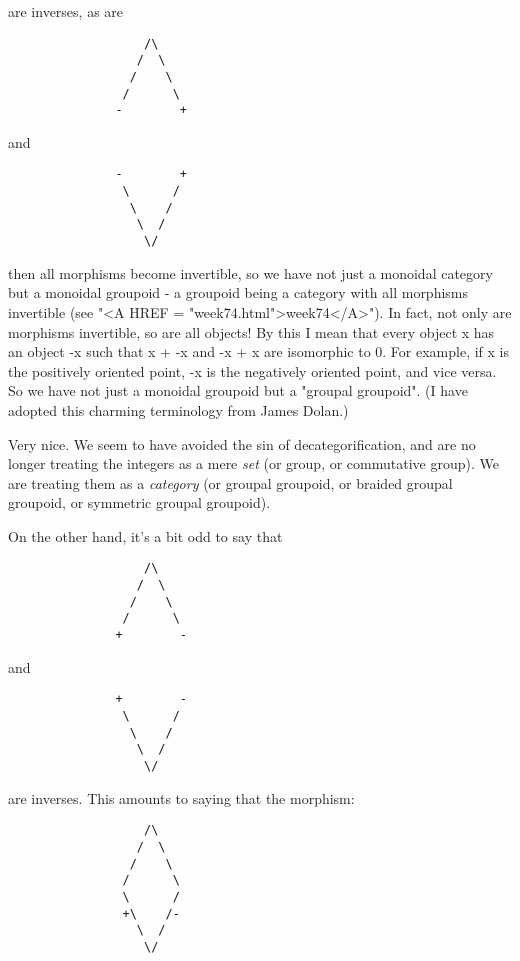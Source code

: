 are inverses, as are 

\begin{verbatim}
                   /\
                  /  \
                 /    \
                /      \
               -        +

\end{verbatim}
    
and
\begin{verbatim}
               -        +
                \      /
                 \    /
                  \  /
                   \/

\end{verbatim}
    
then all morphisms become invertible, so we have not just a monoidal
category but a monoidal groupoid - a groupoid being a category with all
morphisms invertible (see "<A HREF = "week74.html">week74</A>").  In fact, not only are morphisms
invertible, so are all objects!  By this I mean that every object x
has an object -x such that x + -x and -x + x are isomorphic to 0.
For example, if x is the positively oriented point, -x is the negatively
oriented point, and vice versa.  So we have not just a monoidal groupoid
but a "groupal groupoid".  (I have adopted this charming terminology
from James Dolan.)

Very nice.  We seem to have avoided the sin of decategorification, and
are no longer treating the integers as a mere \emph{set} (or group, or
commutative group).  We are treating them as a \emph{category} (or groupal 
groupoid, or braided groupal groupoid, or symmetric groupal groupoid).

On the other hand, it's a bit odd to say that 

\begin{verbatim}
                   /\
                  /  \
                 /    \
                /      \
               +        -

\end{verbatim}
    
and
\begin{verbatim}
               +        -
                \      /
                 \    /
                  \  /
                   \/

\end{verbatim}
    
are inverses.  This amounts to saying that the morphism:

\begin{verbatim}
                   /\
                  /  \
                 /    \
                /      \
                \      /
                +\    /-
                  \  /
                   \/

\end{verbatim}
    
